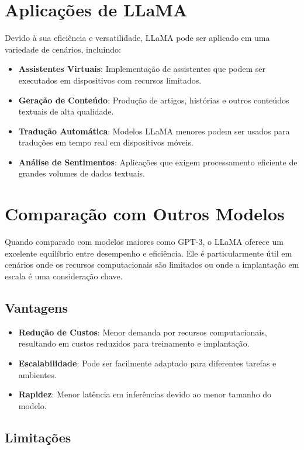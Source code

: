 \documentclass[14pt,a4paper,oneside]{book}
\begin{document}
\section{Aplicações de LLaMA}

Devido à sua eficiência e versatilidade, LLaMA pode ser aplicado em uma variedade de cenários, incluindo:

\begin{itemize}
	\item \textbf{Assistentes Virtuais}: Implementação de assistentes que podem ser executados em dispositivos com recursos limitados.
	\item \textbf{Geração de Conteúdo}: Produção de artigos, histórias e outros conteúdos textuais de alta qualidade.
	\item \textbf{Tradução Automática}: Modelos LLaMA menores podem ser usados para traduções em tempo real em dispositivos móveis.
	\item \textbf{Análise de Sentimentos}: Aplicações que exigem processamento eficiente de grandes volumes de dados textuais.
\end{itemize}

\section{Comparação com Outros Modelos}

Quando comparado com modelos maiores como GPT-3, o LLaMA oferece um excelente equilíbrio entre desempenho e eficiência. Ele é particularmente útil em cenários onde os recursos computacionais são limitados ou onde a implantação em escala é uma consideração chave.

\subsection{Vantagens}

\begin{itemize}
	\item \textbf{Redução de Custos}: Menor demanda por recursos computacionais, resultando em custos reduzidos para treinamento e implantação.
	\item \textbf{Escalabilidade}: Pode ser facilmente adaptado para diferentes tarefas e ambientes.
	\item \textbf{Rapidez}: Menor latência em inferências devido ao menor tamanho do modelo.
\end{itemize}

\subsection{Limitações}
\end{document}
